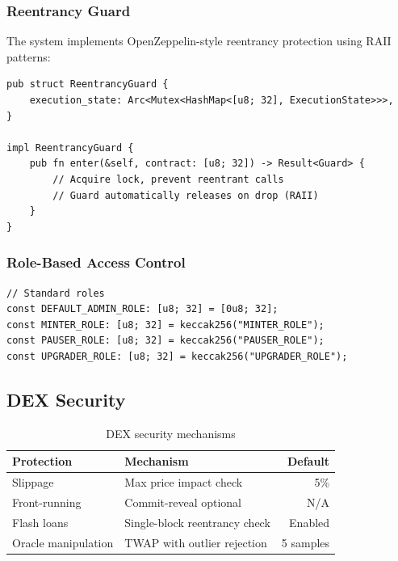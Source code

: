 \documentclass[11pt,a4paper]{article}
\begin{document}
\subsubsection{Reentrancy Guard}

The system implements OpenZeppelin-style reentrancy protection using RAII patterns:

\begin{lstlisting}[style=rust]
pub struct ReentrancyGuard {
    execution_state: Arc<Mutex<HashMap<[u8; 32], ExecutionState>>>,
}

impl ReentrancyGuard {
    pub fn enter(&self, contract: [u8; 32]) -> Result<Guard> {
        // Acquire lock, prevent reentrant calls
        // Guard automatically releases on drop (RAII)
    }
}
\end{lstlisting}

\subsubsection{Role-Based Access Control}

\begin{lstlisting}[style=rust]
// Standard roles
const DEFAULT_ADMIN_ROLE: [u8; 32] = [0u8; 32];
const MINTER_ROLE: [u8; 32] = keccak256("MINTER_ROLE");
const PAUSER_ROLE: [u8; 32] = keccak256("PAUSER_ROLE");
const UPGRADER_ROLE: [u8; 32] = keccak256("UPGRADER_ROLE");
\end{lstlisting}

\subsection{DEX Security}

\begin{table}[H]
\centering
\begin{tabular}{llr}
\toprule
\textbf{Protection} & \textbf{Mechanism} & \textbf{Default} \\
\midrule
Slippage & Max price impact check & 5\% \\
Front-running & Commit-reveal optional & N/A \\
Flash loans & Single-block reentrancy check & Enabled \\
Oracle manipulation & TWAP with outlier rejection & 5 samples \\
\bottomrule
\end{tabular}
\caption{DEX security mechanisms}
\end{table}

\end{document}
